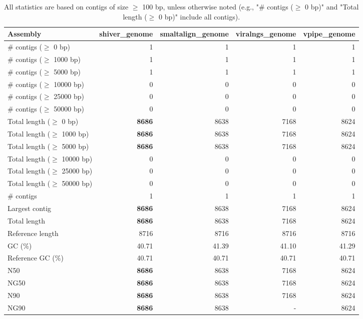 \documentclass[12pt,a4paper]{article}
\begin{document}
\begin{table}[ht]
\begin{center}
\caption{All statistics are based on contigs of size $\geq$ 100 bp, unless otherwise noted (e.g., "\# contigs ($\geq$ 0 bp)" and "Total length ($\geq$ 0 bp)" include all contigs).}
\begin{tabular}{|l*{4}{|r}|}
\hline
Assembly & shiver\_genome & smaltalign\_genome & viralngs\_genome & vpipe\_genome \\ \hline
\# contigs ($\geq$ 0 bp) & 1 & 1 & 1 & 1 \\ \hline
\# contigs ($\geq$ 1000 bp) & 1 & 1 & 1 & 1 \\ \hline
\# contigs ($\geq$ 5000 bp) & 1 & 1 & 1 & 1 \\ \hline
\# contigs ($\geq$ 10000 bp) & 0 & 0 & 0 & 0 \\ \hline
\# contigs ($\geq$ 25000 bp) & 0 & 0 & 0 & 0 \\ \hline
\# contigs ($\geq$ 50000 bp) & 0 & 0 & 0 & 0 \\ \hline
Total length ($\geq$ 0 bp) & {\bf 8686} & 8638 & 7168 & 8624 \\ \hline
Total length ($\geq$ 1000 bp) & {\bf 8686} & 8638 & 7168 & 8624 \\ \hline
Total length ($\geq$ 5000 bp) & {\bf 8686} & 8638 & 7168 & 8624 \\ \hline
Total length ($\geq$ 10000 bp) & 0 & 0 & 0 & 0 \\ \hline
Total length ($\geq$ 25000 bp) & 0 & 0 & 0 & 0 \\ \hline
Total length ($\geq$ 50000 bp) & 0 & 0 & 0 & 0 \\ \hline
\# contigs & 1 & 1 & 1 & 1 \\ \hline
Largest contig & {\bf 8686} & 8638 & 7168 & 8624 \\ \hline
Total length & {\bf 8686} & 8638 & 7168 & 8624 \\ \hline
Reference length & 8716 & 8716 & 8716 & 8716 \\ \hline
GC (\%) & 40.71 & 41.39 & 41.10 & 41.29 \\ \hline
Reference GC (\%) & 40.71 & 40.71 & 40.71 & 40.71 \\ \hline
N50 & {\bf 8686} & 8638 & 7168 & 8624 \\ \hline
NG50 & {\bf 8686} & 8638 & 7168 & 8624 \\ \hline
N90 & {\bf 8686} & 8638 & 7168 & 8624 \\ \hline
NG90 & {\bf 8686} & 8638 & - & 8624 \\ \hline

\end{tabular}
\end{center}
\end{table}
\end{document}
